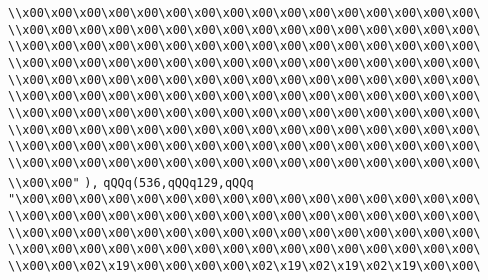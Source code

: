 \verb|\\x00\x00\x00\x00\x00\x00\x00\x00\x00\x00\x00\x00\x00\x00\x00\x00\|\newline
\verb|\\x00\x00\x00\x00\x00\x00\x00\x00\x00\x00\x00\x00\x00\x00\x00\x00\|\newline
\verb|\\x00\x00\x00\x00\x00\x00\x00\x00\x00\x00\x00\x00\x00\x00\x00\x00\|\newline
\verb|\\x00\x00\x00\x00\x00\x00\x00\x00\x00\x00\x00\x00\x00\x00\x00\x00\|\newline
\verb|\\x00\x00\x00\x00\x00\x00\x00\x00\x00\x00\x00\x00\x00\x00\x00\x00\|\newline
\verb|\\x00\x00\x00\x00\x00\x00\x00\x00\x00\x00\x00\x00\x00\x00\x00\x00\|\newline
\verb|\\x00\x00\x00\x00\x00\x00\x00\x00\x00\x00\x00\x00\x00\x00\x00\x00\|\newline
\verb|\\x00\x00\x00\x00\x00\x00\x00\x00\x00\x00\x00\x00\x00\x00\x00\x00\|\newline
\verb|\\x00\x00\x00\x00\x00\x00\x00\x00\x00\x00\x00\x00\x00\x00\x00\x00\|\newline
\verb|\\x00\x00\x00\x00\x00\x00\x00\x00\x00\x00\x00\x00\x00\x00\x00\x00\|\newline
\verb|\\x00\x00"|\newline
\verb|),|\newline
\verb|qQQq(536,qQQq129,qQQq|\newline
\verb|"\x00\x00\x00\x00\x00\x00\x00\x00\x00\x00\x00\x00\x00\x00\x00\x00\|\newline
\verb|\\x00\x00\x00\x00\x00\x00\x00\x00\x00\x00\x00\x00\x00\x00\x00\x00\|\newline
\verb|\\x00\x00\x00\x00\x00\x00\x00\x00\x00\x00\x00\x00\x00\x00\x00\x00\|\newline
\verb|\\x00\x00\x00\x00\x00\x00\x00\x00\x00\x00\x00\x00\x00\x00\x00\x00\|\newline
\verb|\\x00\x00\x02\x19\x00\x00\x00\x00\x02\x19\x02\x19\x02\x19\x00\x00\|\newline
